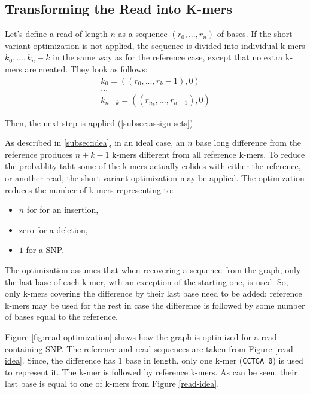 \subsection{Transforming the Read into K-mers}

Let's define a read of length $n$ as a sequence $(r_0, ..., r_n)$ of bases. If the short variant optimization is not applied, the sequence is divided into individual k-mers $k_0, ..., k_n-k$ in the same way as for the reference case, except that no extra k-mers are created. They look as follows:
\begin{gather}
k_0 = ((r_0, ..., r_k-1), 0) \\
... \\
k_{n-k} = ((r_{n_k}, ..., r_{n-1}), 0)
\end{gather}

Then, the next step is applied (\ref{subsec:assign-sets}).

As described in \ref{subsec:idea}, in an ideal case, an $n$ base long difference from the reference produces $n + k - 1$ k-mers different from all reference k-mers. To reduce the probablity taht some of the k-mers actually colides with either the reference, or another read, the short variant optimization may be applied. The optimization reduces the number of k-mers representing to:
\begin{itemize}
\item $n$ for for an insertion,
\item zero for a deletion,
\item $1$ for a SNP.
\end{itemize}

The optimization assumes that when recovering a sequence from the graph, only the last base of each k-mer, wth an exception of the starting one, is used. So, only k-mers covering the difference by their last base need to be added; reference k-mers may be used for the rest in case the difference is followed by some number of bases equal to the reference. 

Figure \ref{fig:read-optimization} shows how the graph is optimized for a read containing SNP. The reference and read sequences are taken from Figure \ref{read-idea}. Since, the difference has 1 base in length, only one k-mer (\texttt{CCTGA\_0}) is used to represent it. The k-mer is followed by reference k-mers. As can be seen, their last base is equal to one of k-mers from Figure \ref{read-idea}.

